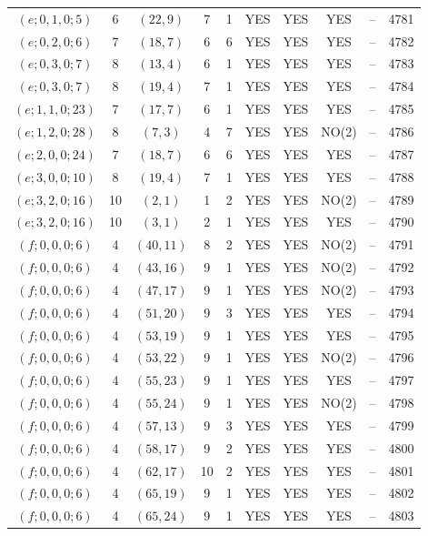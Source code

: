 \begin{longtable}{|c|c|c|c|c|c|c|c|c|c|}
$(e; 0, 1, 0; 5)$ & 6 & $(22, 9)$ & 7 & 1 & YES & YES & YES & -- & 4781\\
$(e; 0, 2, 0; 6)$ & 7 & $(18, 7)$ & 6 & 6 & YES & YES & YES & -- & 4782\\
$(e; 0, 3, 0; 7)$ & 8 & $(13, 4)$ & 6 & 1 & YES & YES & YES & -- & 4783\\
$(e; 0, 3, 0; 7)$ & 8 & $(19, 4)$ & 7 & 1 & YES & YES & YES & -- & 4784\\
$(e; 1, 1, 0; 23)$ & 7 & $(17, 7)$ & 6 & 1 & YES & YES & YES & -- & 4785\\
$(e; 1, 2, 0; 28)$ & 8 & $(7, 3)$ & 4 & 7 & YES & YES & NO(2) & -- & 4786\\
$(e; 2, 0, 0; 24)$ & 7 & $(18, 7)$ & 6 & 6 & YES & YES & YES & -- & 4787\\
$(e; 3, 0, 0; 10)$ & 8 & $(19, 4)$ & 7 & 1 & YES & YES & YES & -- & 4788\\
$(e; 3, 2, 0; 16)$ & 10 & $(2, 1)$ & 1 & 2 & YES & YES & NO(2) & -- & 4789\\
$(e; 3, 2, 0; 16)$ & 10 & $(3, 1)$ & 2 & 1 & YES & YES & YES & -- & 4790\\
$(f; 0, 0, 0; 6)$ & 4 & $(40, 11)$ & 8 & 2 & YES & YES & NO(2) & -- & 4791\\
$(f; 0, 0, 0; 6)$ & 4 & $(43, 16)$ & 9 & 1 & YES & YES & NO(2) & -- & 4792\\
$(f; 0, 0, 0; 6)$ & 4 & $(47, 17)$ & 9 & 1 & YES & YES & NO(2) & -- & 4793\\
$(f; 0, 0, 0; 6)$ & 4 & $(51, 20)$ & 9 & 3 & YES & YES & YES & -- & 4794\\
$(f; 0, 0, 0; 6)$ & 4 & $(53, 19)$ & 9 & 1 & YES & YES & YES & -- & 4795\\
$(f; 0, 0, 0; 6)$ & 4 & $(53, 22)$ & 9 & 1 & YES & YES & NO(2) & -- & 4796\\
$(f; 0, 0, 0; 6)$ & 4 & $(55, 23)$ & 9 & 1 & YES & YES & YES & -- & 4797\\
$(f; 0, 0, 0; 6)$ & 4 & $(55, 24)$ & 9 & 1 & YES & YES & NO(2) & -- & 4798\\
$(f; 0, 0, 0; 6)$ & 4 & $(57, 13)$ & 9 & 3 & YES & YES & YES & -- & 4799\\
$(f; 0, 0, 0; 6)$ & 4 & $(58, 17)$ & 9 & 2 & YES & YES & YES & -- & 4800\\
$(f; 0, 0, 0; 6)$ & 4 & $(62, 17)$ & 10 & 2 & YES & YES & YES & -- & 4801\\
$(f; 0, 0, 0; 6)$ & 4 & $(65, 19)$ & 9 & 1 & YES & YES & YES & -- & 4802\\
$(f; 0, 0, 0; 6)$ & 4 & $(65, 24)$ & 9 & 1 & YES & YES & YES & -- & 4803\\

\end{longtable}
